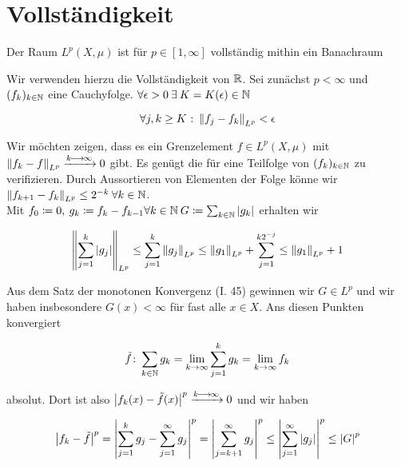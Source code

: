 \documentclass[skript.tex]{subfiles}
\begin{document}
\section{Vollständigkeit}
\begin{theorem}
Der Raum $L^p(X, \mu)$ ist für $p \in [1,\infty]$ vollständig mithin ein Banachraum
\end{theorem}

\begin{bem*}
	Wir verwenden hierzu die Vollständigkeit von $\mathbb{R}$. Sei zunächst $p< \infty$ und $(f_k)_{k \in \mathbb{N}}$ eine Cauchyfolge. $\forall \epsilon>0 \: \exists \: K=K(\epsilon) \in \mathbb{N}$
	
	\begin{equation*}
		\forall j,k \geq K \: \colon \left\lVert f_j - f_k \right\rVert_{L^p} < \epsilon
	\end{equation*}
	
	Wir möchten zeigen, dass es ein Grenzelement $f \in L^p (X, \mu)$ mit $\left\lVert f_k - f \right\rVert_{L^p} \xrightarrow{k\kern -1pt \longrightarrow \kern -1pt\infty} 0$ gibt. Es genügt die für eine Teilfolge von $(f_k)_{k \in \mathbb{N}}$ zu verifizieren. Durch Aussortieren von Elementen der Folge könne wir $ \left\lVert f_{k+1}-f_k \right\rVert_{L^p} \leq 2^{-k} \: \forall k\in\mathbb{N}$. \\
	 Mit $f_0 \coloneqq 0, \: g_k \coloneqq f_k - f_{k-1} \forall k \in \mathbb{N} \: G \coloneqq \sum_{k \in \mathbb{N}} \left| g_k \right|$ erhalten wir
	
	\begin{equation*}
	\left\lVert \sum_{j=1}^{k} \left| g_j \right| \right\rVert_{L^p} \leq \sum_{j=1}^{k} \left\lVert g_j \right\rVert_{L^p} \leq \left\lVert g_1 \right\rVert_{L^p} + \sum_{j=1}^{k 2^{-j}} \leq \left\lVert g_1 \right\rVert_{L^p} +1
	\end{equation*}
	
	Aus dem Satz der monotonen Konvergenz (I. 45) gewinnen wir $G \in L^p$ und wir haben insbesondere $G(x) < \infty$ für fast alle $x \in X$. Ans diesen Punkten konvergiert
	
	\begin{equation*}
	\tilde f \colon \sum_{k\in \mathbb{N}} g_k = \lim_{ k \to \infty} \sum_{j=1}^{k} g_k = \lim_{k \to \infty} f_k
	\end{equation*}

	absolut. Dort ist also $ \left| f_k(x) - \tilde f(x) \right|^p \xrightarrow{k\kern -1pt \longrightarrow \kern -1pt\infty} 0$ und wir haben
	
	\begin{equation*}
	\left| f_k - \tilde f \right|^p = \left|  \sum_{j=1}^{k} g_j - \sum_{j=1}^{\infty} g_j \right|^p = \left| \sum_{j=k+1}^{\infty} g_j \right|^p \leq \left| \sum_{j=1}^{\infty} \left| g_j \right| \right|^p \leq \left| G \right|^p
	\end{equation*}
	

\end{bem*}
\end{document}
